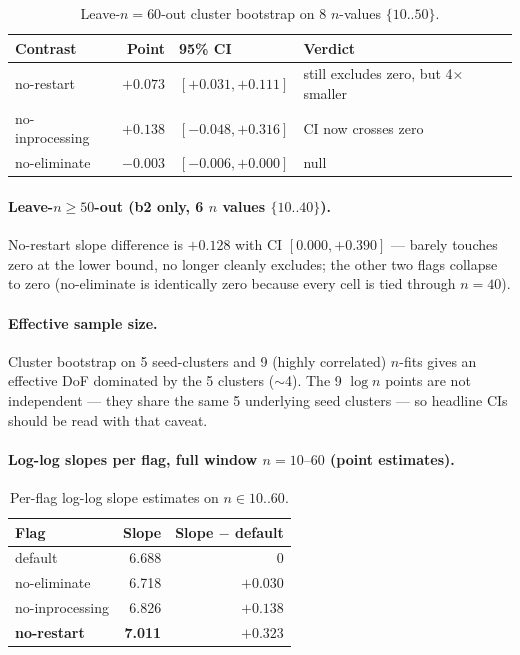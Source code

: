 \documentclass[11pt,a4paper]{article}
\theoremstyle{remark}
\begin{document}
{\begin{table}[H]
\centering
\small
\begin{tabular}{@{}lrl>{\raggedright\arraybackslash}p{4.5cm}@{}}
\toprule
Contrast & Point & 95\% CI & Verdict \\
\midrule
no-restart & $+0.073$ & $[+0.031, +0.111]$ & \makecell[tl]{still excludes zero,\\but 4$\times$ smaller} \\
no-inprocessing & $+0.138$ & $[-0.048, +0.316]$ & CI now crosses zero \\
no-eliminate & $-0.003$ & $[-0.006, +0.000]$ & null \\
\bottomrule
\end{tabular}
\caption{Leave-$n{=}60$-out cluster bootstrap on 8 $n$-values $\{10..50\}$.}
\label{tab:leave-out}
\end{table}

\paragraph{Leave-$n \ge 50$-out (b2 only, 6 $n$ values $\{10..40\}$).}
No-restart slope difference is $+0.128$ with CI $[0.000, +0.390]$ ---
barely touches zero at the lower bound, no longer cleanly excludes; the
other two flags collapse to zero (no-eliminate is identically zero because
every cell is tied through $n=40$).

\paragraph{Effective sample size.} Cluster bootstrap on 5 seed-clusters
and 9 (highly correlated) $n$-fits gives an effective DoF dominated by
the 5 clusters ($\sim$4). The 9 $\log n$ points are not independent ---
they share the same 5 underlying seed clusters --- so headline CIs should
be read with that caveat.

\paragraph{Log-log slopes per flag, full window $n = 10\text{--}60$
(point estimates).}

\begin{table}[H]
\centering
\small
\begin{tabular}{@{}lrr@{}}
\toprule
Flag & Slope & Slope $-$ default \\
\midrule
default & 6.688 & 0 \\
no-eliminate & 6.718 & $+0.030$ \\
no-inprocessing & 6.826 & $+0.138$ \\
\textbf{no-restart} & \textbf{7.011} & $\bm{+0.323}$ \\
\bottomrule
\end{tabular}
\caption{Per-flag log-log slope estimates on $n\in 10..60$.}
\label{tab:flag-slopes}
\end{table}

}
\end{document}
